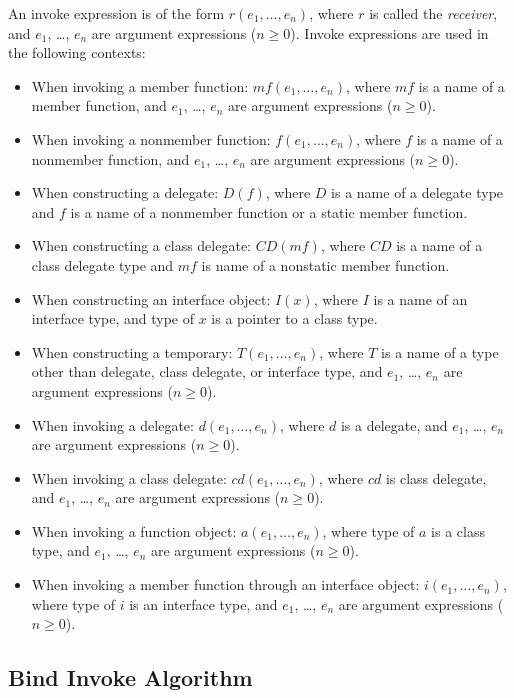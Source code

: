 \documentclass[a4paper,oneside,11pt]{book}
\theoremstyle{definition}
\begin{document}
An invoke expression is of the form $r(e_1, \ldots, e_n)$, where $r$ is called the \emph{receiver}, and $e_1$, \ldots, $e_n$ are argument expressions ($n \geq 0$).
Invoke expressions are used in the following contexts:

\begin{itemize}
\item
When invoking a member function: $mf(e_1, \ldots, e_n)$, where $mf$ is a name of a member function,
and $e_1$, \ldots, $e_n$ are argument expressions ($n \geq 0$).
\item
When invoking a nonmember function: $f(e_1, \ldots, e_n)$, where $f$ is a name of a nonmember function,
and $e_1$, \ldots, $e_n$ are argument expressions ($n \geq 0$).
\item
When constructing a delegate: $D(f)$, where $D$ is a name of a delegate type and $f$ is a name of a nonmember function or a static member function.
\item
When constructing a class delegate: $CD(mf)$, where $CD$ is a name of a class delegate type and $mf$ is name of a nonstatic member function.
\item
When constructing an interface object: $I(x)$, where $I$ is a name of an interface type, and type of $x$ is a pointer to a class type.
\item
When constructing a temporary: $T(e_1, \ldots, e_n)$, where $T$ is a name of a type other than delegate, class delegate, or interface type,
and $e_1$, \ldots, $e_n$ are argument expressions ($n \geq 0$).
\item
When invoking a delegate: $d(e_1, \ldots, e_n)$, where $d$ is a delegate, and $e_1$, \ldots, $e_n$ are argument expressions ($n \geq 0$).
\item
When invoking a class delegate: $cd(e_1, \ldots, e_n)$, where $cd$ is class delegate, and $e_1$, \ldots, $e_n$ are argument expressions ($n \geq 0$).
\item
When invoking a function object: $a(e_1, \ldots, e_n)$, where type of $a$ is a class type, and $e_1$, \ldots, $e_n$ are argument expressions ($n \geq 0$).
\item
When invoking a member function through an interface object: $i(e_1, \ldots, e_n)$, where type of $i$ is an interface type,
and $e_1$, \ldots, $e_n$ are argument expressions ($n \geq 0$).
\end{itemize}

\subsection{Bind Invoke Algorithm}
\end{document}
